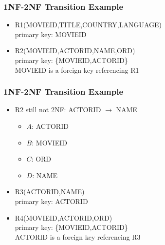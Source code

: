 \documentclass[dvipsnames]{beamer}
\begin{document}
\begin{frame}
  \frametitle{1NF-2NF Transition Example}

  \begin{example}
    \begin{itemize}
      \item R1(MOVIEID,TITLE,COUNTRY,LANGUAGE)\\
        primary key: MOVIEID

      \pause
      \item R2(MOVIEID,ACTORID,NAME,ORD)\\
        primary key: \{MOVIEID,ACTORID\}\\
        MOVIEID is a foreign key referencing R1
    \end{itemize}
 \end{example}
\end{frame}

\begin{frame}
  \frametitle{1NF-2NF Transition Example}

  \begin{example}
    \begin{itemize}
      \item R2 still not 2NF: ACTORID $\rightarrow$ NAME

      \pause
      \begin{itemize}
        \item $A$: ACTORID
        \item $B$: MOVIEID
        \item $C$: ORD
        \item $D$: NAME
      \end{itemize}
    \end{itemize}

    \pause
    \begin{itemize}
      \item R3(ACTORID,NAME)\\
        primary key: ACTORID

      \pause
      \item R4(MOVIEID,ACTORID,ORD)\\
        primary key: \{MOVIEID,ACTORID\}\\
        ACTORID is a foreign key referencing R3
    \end{itemize}
  \end{example}
\end{frame}
\end{document}
